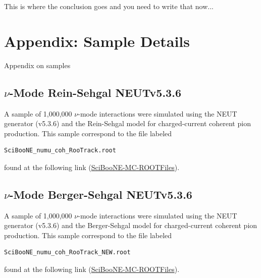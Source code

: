 \documentclass[11pt]{article}
\begin{document}
This is where the conclusion goes and you need to write that now...


%
\newpage

\appendix


\section{Appendix: Sample Details}
\label{sec:SampleAppendix}

Appendix on samples

\subsection{$\nu$-Mode Rein-Sehgal NEUTv5.3.6}
\label{sub:NMRSv5.3.6}
A sample of 1,000,000 $\nu$-mode interactions were simulated using the NEUT generator (v5.3.6) and the Rein-Sehgal model for charged-current coherent pion production. This sample correspond to the file labeled 
\begin{verbatim}
SciBooNE_numu_coh_RooTrack.root
\end{verbatim}
found at the following link (\href{https://drive.google.com/open?id=0B4rvJl9swUOxcEtpSl94RDRsc3c}{SciBooNE-MC-ROOTFiles}).

\subsection{$\nu$-Mode Berger-Sehgal NEUTv5.3.6}
\label{sub:NMBSv5.3.6}
A sample of 1,000,000 $\nu$-mode interactions were simulated using the NEUT generator (v5.3.6) and the Berger-Sehgal model for charged-current coherent pion production. This sample correspond to the file labeled
\begin{verbatim}
SciBooNE_numu_coh_RooTrack_NEW.root
\end{verbatim}
found at the following link (\href{https://drive.google.com/open?id=0B4rvJl9swUOxcEtpSl94RDRsc3c}{SciBooNE-MC-ROOTFiles}).
\end{document}

